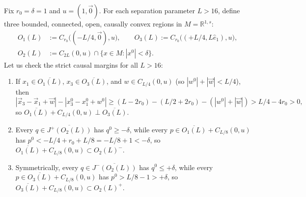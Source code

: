 \documentclass[11pt,a4paper]{article}
\theoremstyle{definition}
\theoremstyle{remark}
\newcommand{\RR}{\mathbb{R}}
\begin{document}
Fix $r_0 = \delta = 1$ and $u=(1,\vec{0})$. For each separation parameter $L > 16$, define three bounded, connected, open, causally convex regions in $M = \RR^{1,s}$:
\begin{equation}\label{eq:sorkin-regions}
\begin{aligned}
O_1(L) &:= C_{r_0}\bigl((-L/4,\vec{0}), u\bigr), \qquad
O_3(L) := C_{r_0}\bigl((+L/4, L\hat{e}_1), u\bigr), \\
O_2(L) &:= C_{2L}(0, u) \cap \{x\in M : |x^0| < \delta\}.
\end{aligned}
\end{equation}
Let us check the strict causal margins for all $L > 16$:
\begin{enumerate}[label=\textup{(\arabic*)},leftmargin=*,nosep]
\item If $x_1\in\overline{O_1(L)}$, $x_3\in\overline{O_3(L)}$, and $w\in C_{L/4}(0,u)$ (so $|w^0|+|\vec{w}|<L/4$), then
\[
|\vec{x}_3-\vec{x}_1+\vec{w}| - |x_3^0-x_1^0+w^0| \ge (L-2r_0) - (L/2+2r_0) - (|w^0|+|\vec{w}|) > L/4 - 4r_0 > 0,
\]
so $\overline{O_1(L)} + C_{L/4}(0,u) \perp \overline{O_3(L)}$.
\item Every $q\in\overline{J^+(O_2(L))}$ has $q^0\ge -\delta$, while every $p\in\overline{O_1(L)}+C_{L/8}(0,u)$ has $p^0 < -L/4 + r_0 + L/8 = -L/8 + 1 < -\delta$, so $\overline{O_1(L)} + C_{L/8}(0,u) \subset O_2(L)^-$.
\item Symmetrically, every $q\in\overline{J^-(O_2(L))}$ has $q^0\le +\delta$, while every $p\in\overline{O_3(L)}+C_{L/8}(0,u)$ has $p^0 > L/8 - 1 > +\delta$, so $\overline{O_3(L)} + C_{L/8}(0,u) \subset O_2(L)^+$.
\end{enumerate}
\end{document}

